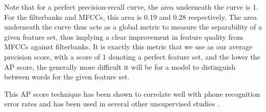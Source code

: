 Note that for a perfect precision-recall curve, the area underneath the curve is 1.
For the filterbanks and MFCCs, this area is 0.19 and 0.28 respectively.
The area underneath the curve thus acts as a global metric to measure the separability of a given feature set, thus implying a clear improvement in feature quality from MFCCs against filterbanks.
It is exactly this metric that we use as our average precision score, with a score of 1 denoting a perfect feature set, and the lower the AP score, the generally more difficult it will be for a model to distinguish between words for the given feature set.

This AP score technique has been shown to correlate well with phone recognition error rates \cite{DBLP:conf/interspeech/CarlinTJH11} and has been used in several other unsupervised studies \cite{kamper_elsner_jansen_goldwater_2015}.